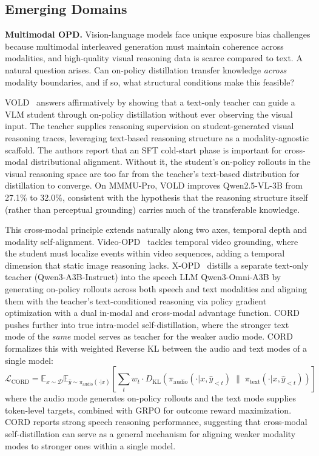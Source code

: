 \documentclass{article} %
\newcommand{\E}{\mathbb{E}}
\newcommand{\KL}{D_{\mathrm{KL}}}
\newcommand{\loss}{\mathcal{L}}
\begin{document}
\subsection{Emerging Domains}
\label{subsec:emerging}

\textbf{Multimodal OPD.} Vision-language models face unique exposure bias challenges because multimodal interleaved generation must maintain coherence across modalities, and high-quality visual reasoning data is scarce compared to text. A natural question arises. Can on-policy distillation transfer knowledge \emph{across} modality boundaries, and if so, what structural conditions make this feasible?

VOLD~\citep{2510.23497} answers affirmatively by showing that a text-only teacher can guide a VLM student through on-policy distillation without ever observing the visual input. The teacher supplies reasoning supervision on student-generated visual reasoning traces, leveraging text-based reasoning structure as a modality-agnostic scaffold. The authors report that an SFT cold-start phase is important for cross-modal distributional alignment. Without it, the student's on-policy rollouts in the visual reasoning space are too far from the teacher's text-based distribution for distillation to converge. On MMMU-Pro, VOLD improves Qwen2.5-VL-3B from 27.1\% to 32.0\%, consistent with the hypothesis that the reasoning structure itself (rather than perceptual grounding) carries much of the transferable knowledge.

This cross-modal principle extends naturally along two axes, temporal depth and modality self-alignment. Video-OPD~\citep{2602.02994} tackles temporal video grounding, where the student must localize events within video sequences, adding a temporal dimension that static image reasoning lacks. X-OPD~\citep{2603.24596} distills a separate text-only teacher (Qwen3-A3B-Instruct) into the speech LLM Qwen3-Omni-A3B by generating on-policy rollouts across both speech and text modalities and aligning them with the teacher's text-conditioned reasoning via policy gradient optimization with a dual in-modal and cross-modal advantage function. CORD~\citep{hu2026cord} pushes further into true intra-model self-distillation, where the stronger text mode of the \emph{same} model serves as teacher for the weaker audio mode. CORD formalizes this with weighted Reverse KL between the audio and text modes of a single model:
\begin{equation}
    \loss_{\text{CORD}} = \E_{x \sim \mathcal{D}} \E_{\hat{y} \sim \pi_{\text{audio}}(\cdot|x)} \left[ \sum_{t} w_t \cdot \KL\!\left(\pi_{\text{audio}}(\cdot|x, \hat{y}_{<t}) \;\|\; \pi_{\text{text}}(\cdot|x, \hat{y}_{<t})\right) \right]
\end{equation}
where the audio mode generates on-policy rollouts and the text mode supplies token-level targets, combined with GRPO for outcome reward maximization. CORD reports strong speech reasoning performance, suggesting that cross-modal self-distillation can serve as a general mechanism for aligning weaker modality modes to stronger ones within a single model.
\end{document}
